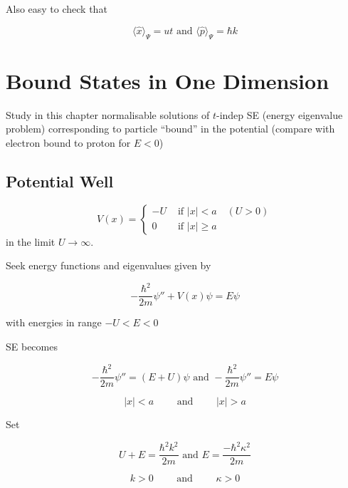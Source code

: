 \documentclass[a4paper]{article}
\begin{document}
Also easy to check that

\[ \langle  \hat{x} \rangle_{\Psi}  = ut \text{ and } \langle \hat{p} \rangle_{\Psi} = \hbar k \]


\section{Bound States in One Dimension}

Study in this chapter normalisable solutions of $ t $-indep SE (energy eigenvalue problem) corresponding to particle ``bound'' in the potential (compare with electron bound to proton for $ E < 0 $)


\subsection{Potential Well}


	\begin{center}
\end{center}

	\[ V(x) = \begin{cases} -U  & \text{ if } | x |  < a \quad (U > 0)\\ 0 & \text{ if } | x | \geq a \end{cases} \] in the limit $ U \to \infty $.


Seek energy functions and eigenvalues given by 

\[ -\frac{\hbar^{2}}{2m} \psi''  + V(x) \psi = E \psi \]

with energies in range $ -U < E < 0 $

SE becomes 

\[ -\frac{\hbar^{2}}{2m} \psi'' = (E+U) \psi \text{ and } -\frac{\hbar^{2}}{2m} \psi'' = E \psi  \]

\[ | x | < a \qquad \text{ and } \qquad | x | > a \]

Set 

\[ U + E = \frac{\hbar^{2}k^{2}}{2m} \text{ and } E = \frac{-\hbar^{2}\kappa^{2}}{2m}   \]

\[ k > 0 \qquad \text{ and } \qquad \kappa > 0 \]
\end{document}

